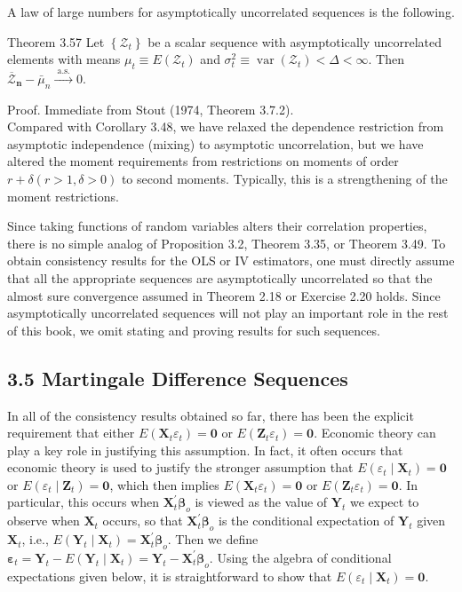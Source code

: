 \documentclass[10pt]{article}
\begin{document}
A law of large numbers for asymptotically uncorrelated sequences is the following.

Theorem 3.57 Let $\left\{\mathcal{Z}_{t}\right\}$ be a scalar sequence with asymptotically uncorrelated elements with means $\mu_{t} \equiv E\left(\mathcal{Z}_{t}\right)$ and $\sigma_{t}^{2} \equiv \operatorname{var}\left(\mathcal{Z}_{t}\right)<\Delta<\infty$. Then $\overline{\mathcal{Z}}_{\boldsymbol{n}}-\bar{\mu}_{n} \xrightarrow{\text { a.s. }} 0$.

Proof. Immediate from Stout (1974, Theorem 3.7.2).\\
Compared with Corollary 3.48, we have relaxed the dependence restriction from asymptotic independence (mixing) to asymptotic uncorrelation, but we have altered the moment requirements from restrictions on moments of order $r+\delta(r>1, \delta>0)$ to second moments. Typically, this is a strengthening of the moment restrictions.

Since taking functions of random variables alters their correlation properties, there is no simple analog of Proposition 3.2, Theorem 3.35, or Theorem 3.49. To obtain consistency results for the OLS or IV estimators, one must directly assume that all the appropriate sequences are asymptotically uncorrelated so that the almost sure convergence assumed in Theorem 2.18 or Exercise 2.20 holds. Since asymptotically uncorrelated sequences will not play an important role in the rest of this book, we omit stating and proving results for such sequences.

\subsection*{3.5 Martingale Difference Sequences}
In all of the consistency results obtained so far, there has been the explicit requirement that either $E\left(\mathbf{X}_{t} \varepsilon_{t}\right)=\mathbf{0}$ or $E\left(\mathbf{Z}_{t} \varepsilon_{t}\right)=\mathbf{0}$. Economic theory can play a key role in justifying this assumption. In fact, it often occurs that economic theory is used to justify the stronger assumption that $E\left(\varepsilon_{t} \mid \mathbf{X}_{t}\right)= \mathbf{0}$ or $E\left(\varepsilon_{t} \mid \mathbf{Z}_{t}\right)=\mathbf{0}$, which then implies $E\left(\mathbf{X}_{t} \varepsilon_{t}\right)=\mathbf{0}$ or $E\left(\mathbf{Z}_{t} \varepsilon_{t}\right)=\mathbf{0}$. In particular, this occurs when $\mathbf{X}_{t}^{\prime} \boldsymbol{\beta}_{o}$ is viewed as the value of $\mathbf{Y}_{t}$ we expect to observe when $\mathbf{X}_{t}$ occurs, so that $\mathbf{X}_{t}^{\prime} \boldsymbol{\beta}_{o}$ is the conditional expectation of $\mathbf{Y}_{t}$ given $\mathbf{X}_{t}$, i.e., $E\left(\mathbf{Y}_{t} \mid \mathbf{X}_{t}\right)=\mathbf{X}_{t}^{\prime} \boldsymbol{\beta}_{o}$. Then we define $\boldsymbol{\varepsilon}_{t}=\mathbf{Y}_{t}-E\left(\mathbf{Y}_{t} \mid \mathbf{X}_{t}\right)= \mathbf{Y}_{t}-\mathbf{X}_{t}^{\prime} \boldsymbol{\beta}_{o}$. Using the algebra of conditional expectations given below, it is straightforward to show that $E\left(\varepsilon_{t} \mid \mathbf{X}_{t}\right)=\mathbf{0}$.
\end{document}
